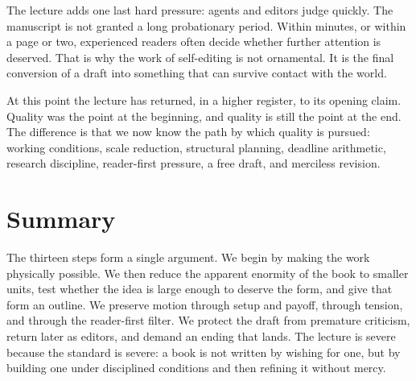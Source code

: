 The lecture adds one last hard pressure: agents and editors judge quickly. The manuscript is not granted a long probationary period. Within minutes, or within a page or two, experienced readers often decide whether further attention is deserved. That is why the work of self-editing is not ornamental. It is the final conversion of a draft into something that can survive contact with the world.

At this point the lecture has returned, in a higher register, to its opening claim. Quality was the point at the beginning, and quality is still the point at the end. The difference is that we now know the path by which quality is pursued: working conditions, scale reduction, structural planning, deadline arithmetic, research discipline, reader-first pressure, a free draft, and merciless revision.

\section{Summary}

The thirteen steps form a single argument. We begin by making the work physically possible. We then reduce the apparent enormity of the book to smaller units, test whether the idea is large enough to deserve the form, and give that form an outline. We preserve motion through setup and payoff, through tension, and through the reader-first filter. We protect the draft from premature criticism, return later as editors, and demand an ending that lands. The lecture is severe because the standard is severe: a book is not written by wishing for one, but by building one under disciplined conditions and then refining it without mercy.